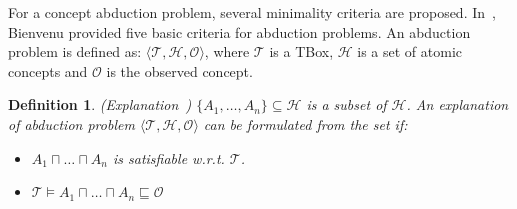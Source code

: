\documentclass{article}
\newtheorem{mydef}{Definition}
\begin{document}
For a concept abduction problem, several minimality criteria are proposed. 
In~\cite{bienvenu08complexity}, Bienvenu provided five basic criteria for abduction problems.
An abduction problem is defined as: $ \langle \mathcal{T}, \mathcal{H}, \mathcal{O}\rangle$, where $\mathcal{T}$ is a TBox, $\mathcal{H}$ is a set of atomic concepts and $\mathcal{O}$ is the observed concept.

\begin{mydef}{(Explanation~\cite{bienvenu08complexity})}
$\{ A_1,\dots,A_n \} \subseteq \mathcal{H}$ is a subset of $\mathcal{H}$. An explanation of abduction problem $ \langle \mathcal{T}, \mathcal{H}, \mathcal{O}\rangle$ can be formulated from the set if:
\begin{itemize}
\item  $A_1 \sqcap \dots \sqcap A_n$ is satisfiable w.r.t. $\mathcal{T}$.
\item $\mathcal{T}  \vDash  A_1 \sqcap \dots \sqcap A_n \sqsubseteq \mathcal{O}$
\end{itemize}
\end{mydef}
\end{document}
